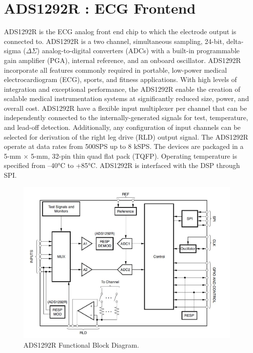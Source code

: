 \section{ADS1292R : ECG Frontend}
ADS1292R is the ECG analog front end chip to which the electrode output is connected to.
ADS1292R is a two channel, simultaneous sampling, 24-bit, delta-sigma ($\Delta$$\Sigma$) analog-to-digital converters (ADCs) with a built-in programmable gain amplifier (PGA), internal reference, and an onboard oscillator.  ADS1292R incorporate all features commonly required in portable, low-power medical electrocardiogram (ECG), sports, and fitness applications. With high levels of integration and exceptional performance, the ADS1292R enable the creation of scalable medical instrumentation systems at significantly reduced size, power, and overall cost. ADS1292R have a flexible input multiplexer per channel that can be independently connected to the internally-generated signals for test, temperature, and lead-off detection. Additionally, any configuration of input channels can be selected for derivation of the right leg drive (RLD) output signal. The ADS1292R operate at data rates from 500SPS up to 8 kSPS. The devices are packaged in a 5-mm × 5-mm, 32-pin thin quad flat pack (TQFP). Operating temperature is specified from –40°C to +85°C. ADS1292R is interfaced with the DSP through SPI.
 \begin{figure}[h]
 	\centering
 	\includegraphics[scale = 0.7 ]{ADS1292R.JPG}
 	\caption{ADS1292R Functional Block Diagram. \cite{ads}\label{ADS1292R}}
 \end{figure}
 
